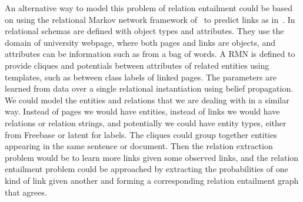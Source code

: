 \documentclass{article}
\begin{document}
An alternative way to model this problem of relation entailment could be based on using the relational Markov network framework of~\cite{Taskar:2002:DPM:2073876.2073934} to predict links as in~\cite{TaskarWAK03}. In~\cite{TaskarWAK03} relational schemas are defined with object types and attributes. They use the domain of university webpage, where both pages and links are objects, and attributes can be information such as from a bag of words. A RMN is defined to provide cliques and potentials between attributes of related entities using templates, such as between class labels of linked pages. The parameters are learned from data over a single relational instantiation using belief propagation. We could model the entities and relations that we are dealing with in a similar way. Instead of pages we would have entities, instead of links we would have relations or relation strings, and potentially we could have entity types, either from Freebase or latent for labels. The cliques could group together entities appearing in the same sentence or document. Then the relation extraction problem would be to learn more links given some observed links, and the relation entailment problem could be approached by extracting the probabilities of one kind of link given another and forming a corresponding relation entailment graph that agrees.




\end{document}
